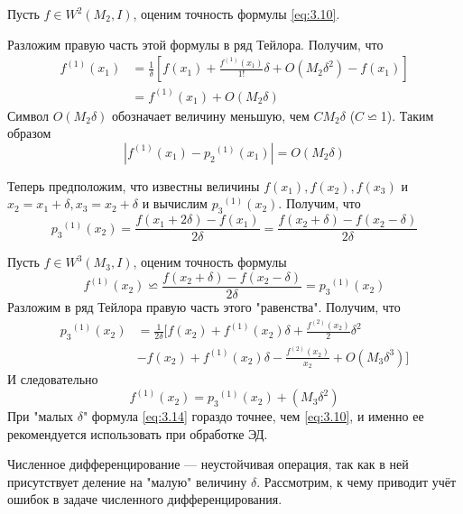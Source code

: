 Пусть $f \in W^2(M_2, I)$, оценим точность формулы \ref{eq:3.10}.

Разложим правую часть этой формулы в ряд Тейлора. Получим, что
\begin{dmath} 
	\begin{aligned}
f^{(1)}(x_1) &= \frac{1}{\delta} [f(x_1) + \frac{f^{(1)}(x_1)}{1!}\delta + O(M_2\delta^2)-f(x_1)] \\
&= f^{(1)}(x_1) + O(M_2 \delta)
	\end{aligned}
\end{dmath}
Символ \textbf{$O(M_2\delta)$} обозначает величину меньшую, чем $CM_2\delta$ ($C\backsimeq$1). Таким образом
\begin{equation}
	|f^{(1)}(x_1) - {p_2}^{(1)}(x_1)| = O(M_2\delta)
\end{equation}

Теперь предположим, что известны величины $f(x_1), f(x_2), f(x_3)$ и $x_2=x_1+\delta, x_3 = x_2 + \delta$ и вычислим  ${p_3}^{(1)}(x_2)$. Получим, что  
\begin{equation}
	{p_3}^{(1)}(x_2) = \frac{f(x_1+2\delta) - f(x_1)}{2\delta} = \frac{f(x_2+\delta) - f(x_2 - \delta)}{2\delta}
\end{equation}

Пусть $f \in W^3(M_3, I)$, оценим точность формулы
\begin{equation} \label{eq:3.14}
	f^{(1)}(x_2) \backsimeq \frac{f(x_2+\delta) - f(x_2 - \delta)}{2\delta} = {p_3}^{(1)}(x_2)
\end{equation}
Разложим в ряд Тейлора правую часть этого "равенства". Получим, что
\begin{dmath} 
	\begin{aligned}
		{p_3}^{(1)}(x_2) &= \frac{1}{2\delta} [f(x_2) + {f^{(1)}(x_2)}\delta + \frac{f^{(2)}(x_2)}{2} \delta^2 \\ &- f(x_2) + f^{(1)}(x_2)\delta - \frac{f^{(2)}(x_2)}{x_2} + O(M_3\delta^3)]
	\end{aligned}
\end{dmath}
И следовательно
\begin{equation}
	f^{(1)}(x_2) =  {p_3}^{(1)}(x_2) + (M_3\delta^2)
\end{equation}
При "малых $\delta$" формула \ref{eq:3.14} гораздо точнее, чем \ref{eq:3.10}, и именно ее рекомендуется использовать при обработке ЭД.

Численное дифференцирование --- неустойчивая операция, так как в ней присутствует деление на "малую" величину $\delta$. Рассмотрим, к чему приводит учёт ошибок в задаче численного дифференцирования.

